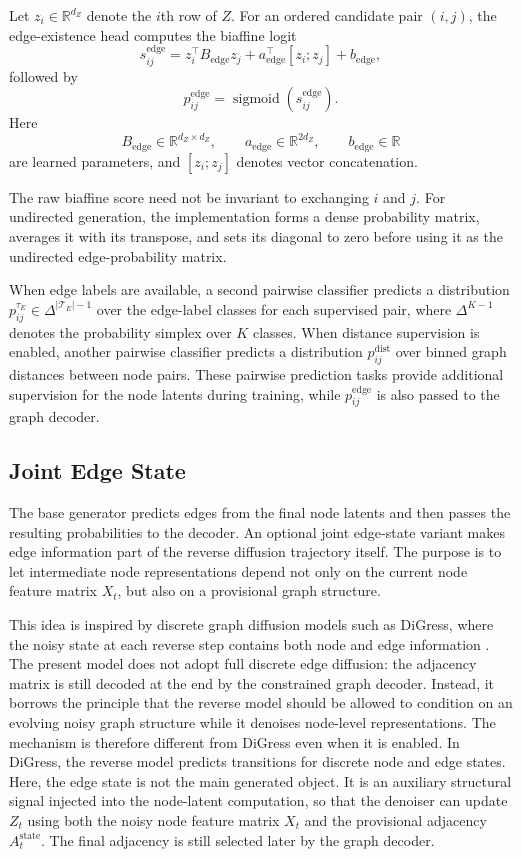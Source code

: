 Let $z_i\in\mathbb{R}^{d_Z}$ denote the $i$th row of $Z$. For an ordered
candidate pair $(i,j)$, the edge-existence head computes the biaffine logit
\[
s_{ij}^{\mathrm{edge}}
=
z_i^{\top}B_{\mathrm{edge}}z_j
+
a_{\mathrm{edge}}^{\top}[z_i;z_j]
+
b_{\mathrm{edge}},
\]
followed by
\[
p_{ij}^{\mathrm{edge}}
=
\operatorname{sigmoid}
\left(
s_{ij}^{\mathrm{edge}}
\right).
\]
Here
\[
B_{\mathrm{edge}}\in\mathbb{R}^{d_Z\times d_Z},
\qquad
a_{\mathrm{edge}}\in\mathbb{R}^{2d_Z},
\qquad
b_{\mathrm{edge}}\in\mathbb{R}
\]
are learned parameters, and $[z_i;z_j]$ denotes vector concatenation.

The raw biaffine score need not be invariant to exchanging $i$ and $j$.
For undirected generation, the implementation forms a dense probability
matrix, averages it with its transpose, and sets its diagonal to zero before
using it as the undirected edge-probability matrix.

 
 When edge labels are available, a
second pairwise classifier predicts a distribution
\(p^{\tau_E}_{ij}\in\Delta^{|\mathcal{T}_E|-1}\) over the edge-label classes
for each supervised pair, where \(\Delta^{K-1}\) denotes the probability
simplex over \(K\) classes. When distance supervision is enabled, another
pairwise classifier predicts a distribution
\(p^{\mathrm{dist}}_{ij}\) over binned graph distances between node pairs. These
pairwise prediction tasks provide additional supervision for the node latents
during training, while \(p^{\mathrm{edge}}_{ij}\) is also passed to the graph
decoder.

\subsection{Joint Edge State}
\label{sec:generator:joint-edge-state}

The base generator predicts edges from the final node latents and then passes
the resulting probabilities to the decoder. An optional joint edge-state variant makes edge information part of the reverse
diffusion trajectory itself. The purpose is to let
intermediate node representations depend not only on the current node feature
matrix \(X_t\), but also on a provisional graph structure.

This idea is inspired by discrete graph diffusion models such as DiGress, where
the noisy state at each reverse step contains both node and edge information
\citep{vignac2022digress}. The present model does not adopt full discrete edge
diffusion: the adjacency matrix is still decoded at the end by the constrained
graph decoder. Instead, it borrows the principle that the reverse model should
be allowed to condition on an evolving noisy graph structure while it denoises
node-level representations.
The mechanism is therefore different from DiGress even when it is enabled. In
DiGress, the reverse model predicts transitions for discrete node and edge
states. Here, the edge state is not the main generated object. It is an
auxiliary structural signal injected into the node-latent computation, so that
the denoiser can update \(Z_t\) using both the noisy node feature matrix
\(X_t\) and the provisional adjacency \(A_t^{\mathrm{state}}\). The final
adjacency is still selected later by the graph decoder.

